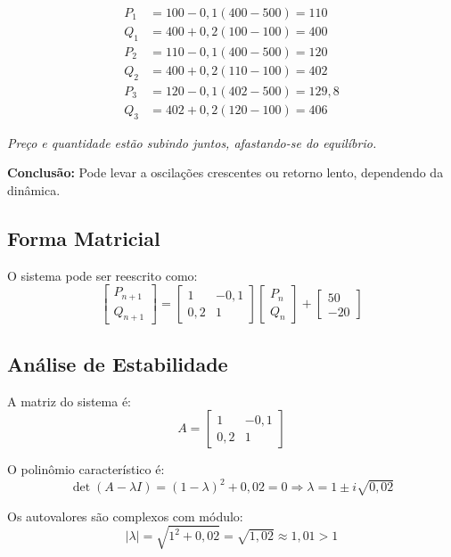 \documentclass{article}
\begin{document}
\[
\begin{aligned}
P_1 &= 100 - 0{,}1(400 - 500) = 110 \\
Q_1 &= 400 + 0{,}2(100 - 100) = 400 \\
P_2 &= 110 - 0{,}1(400 - 500) = 120 \\
Q_2 &= 400 + 0{,}2(110 - 100) = 402 \\
P_3 &= 120 - 0{,}1(402 - 500) = 129{,}8 \\
Q_3 &= 402 + 0{,}2(120 - 100) = 406
\end{aligned}
\]

\textit{Preço e quantidade estão subindo juntos, afastando-se do equilíbrio.}

\textbf{Conclusão:} Pode levar a oscilações crescentes ou retorno lento, dependendo da dinâmica.

\subsection*{Forma Matricial}

O sistema pode ser reescrito como:
\[
\begin{bmatrix}
P_{n+1} \\
Q_{n+1}
\end{bmatrix}
=
\begin{bmatrix}
1 & -0{,}1 \\
0{,}2 & 1
\end{bmatrix}
\begin{bmatrix}
P_n \\
Q_n
\end{bmatrix}
+
\begin{bmatrix}
50 \\
-20
\end{bmatrix}
\]

\subsection*{Análise de Estabilidade}

A matriz do sistema é:
\[
A = \begin{bmatrix}
1 & -0{,}1 \\
0{,}2 & 1
\end{bmatrix}
\]

O polinômio característico é:
\[
\det(A - \lambda I) = (1 - \lambda)^2 + 0{,}02 = 0
\Rightarrow \lambda = 1 \pm i \sqrt{0{,}02}
\]

Os autovalores são complexos com módulo:
\[
|\lambda| = \sqrt{1^2 + 0{,}02} = \sqrt{1{,}02} \approx 1{,}01 > 1
\]
\end{document}
